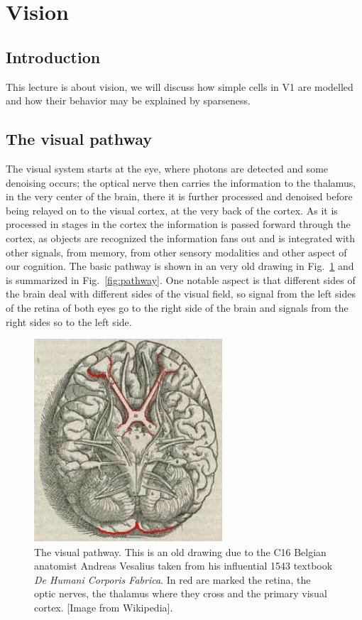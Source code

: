\documentclass[11pt,a4paper]{scrartcl}
\begin{document}
\section*{Vision}

\subsection*{Introduction} 
This lecture is about vision, we will discuss how simple cells in V1
are modelled and how their behavior may be explained by sparseness. 

\subsection*{The visual pathway}
The visual system starts at the eye, where photons are detected and
some denoising occurs; the optical nerve then carries the information
to the thalamus, in the very center of the brain, there it is further
processed and denoised before being relayed on to the visual cortex,
at the very back of the cortex. As it is processed in stages in the
cortex the information is passed forward through the cortex, as
objects are recognized the information fans out and is integrated with
other signals, from memory, from other sensory modalities and other
aspect of our cognition. The basic pathway is shown in an very old
drawing in Fig.~\ref{fig:Fabrica} and is summarized in Fig.~\ref{fig:pathway}. One notable aspect is that
different sides of the brain deal with different sides of the visual
field, so signal from the left sides of the retina of both eyes go to
the right side of the brain and signals from the right sides so to the
left side.

\begin{figure}
\begin{center}
\includegraphics[width=7cm]{Fabrica_VisualSystem.jpg}
\end{center}
\caption{The visual pathway. This is an old drawing due to the C16
  Belgian anatomist Andreas Vesalius taken from his influential 1543
  textbook \textsl{De Humani Corporis Fabrica}. In red are marked the
  retina, the optic nerves, the thalamus where they cross and the
  primary visual cortex. [Image from Wikipedia].\label{fig:Fabrica}}
\end{figure}
\end{document}
